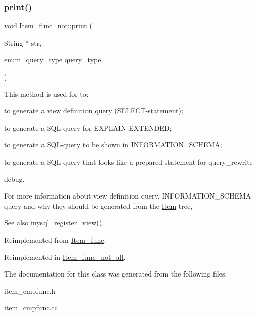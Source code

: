 \mbox{\label{classItem__func__not_a2d11d511c9b23933c2615f703b6e38fa}} 
\subsubsection{\texorpdfstring{print()}{print()}}
{\footnotesize\ttfamily void Item\+\_\+func\+\_\+not\+::print (\begin{DoxyParamCaption}\item[{String $\ast$}]{str,  }\item[{enum\+\_\+query\+\_\+type}]{query\+\_\+type }\end{DoxyParamCaption})\hspace{0.3cm}{\ttfamily [virtual]}}

This method is used for to\+:
\begin{DoxyItemize}
\item to generate a view definition query (S\+E\+L\+E\+CT-\/statement);
\item to generate a S\+QL-\/query for E\+X\+P\+L\+A\+IN E\+X\+T\+E\+N\+D\+ED;
\item to generate a S\+QL-\/query to be shown in I\+N\+F\+O\+R\+M\+A\+T\+I\+O\+N\+\_\+\+S\+C\+H\+E\+MA;
\item to generate a S\+QL-\/query that looks like a prepared statement for query\+\_\+rewrite
\item debug.
\end{DoxyItemize}

For more information about view definition query, I\+N\+F\+O\+R\+M\+A\+T\+I\+O\+N\+\_\+\+S\+C\+H\+E\+MA query and why they should be generated from the \mbox{\hyperlink{classItem}{Item}}-\/tree, \begin{DoxySeeAlso}{See also}
mysql\+\_\+register\+\_\+view(). 
\end{DoxySeeAlso}


Reimplemented from \mbox{\hyperlink{classItem__func_afb302ee25d4721ace27d3f5053d4ee41}{Item\+\_\+func}}.



Reimplemented in \mbox{\hyperlink{classItem__func__not__all_add67ca3249a9c4b6b68e6a6d0fcdd411}{Item\+\_\+func\+\_\+not\+\_\+all}}.



The documentation for this class was generated from the following files\+:\begin{DoxyCompactItemize}
\item 
item\+\_\+cmpfunc.\+h\item 
\mbox{\hyperlink{item__cmpfunc_8cc}{item\+\_\+cmpfunc.\+cc}}\end{DoxyCompactItemize}
